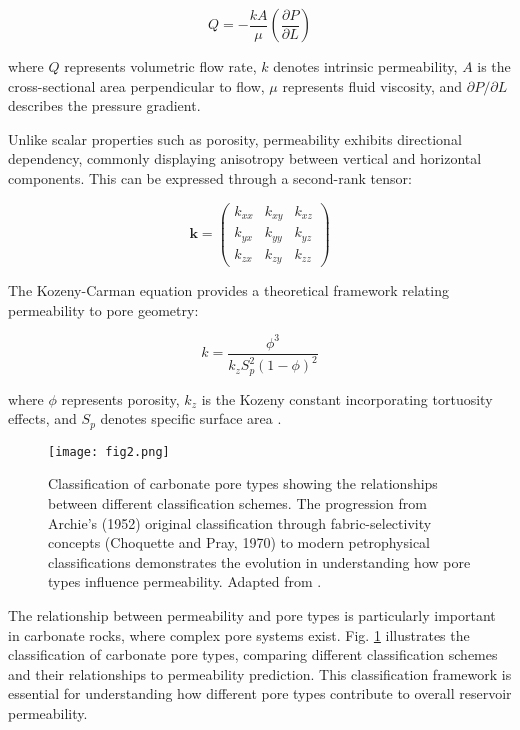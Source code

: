 \documentclass[journal]{IEEEtran}
\begin{document}
\begin{equation}
Q = -\frac{kA}{\mu} \left(\frac{\partial P}{\partial L}\right)
\end{equation}

\noindent where $Q$ represents volumetric flow rate, $k$ denotes intrinsic permeability, $A$ is the cross-sectional area perpendicular to flow, $\mu$ represents fluid viscosity, and $\partial P/\partial L$ describes the pressure gradient.

Unlike scalar properties such as porosity, permeability exhibits directional dependency, commonly displaying anisotropy between vertical and horizontal components. This can be expressed through a second-rank tensor:

\begin{equation}
\mathbf{k} = \begin{pmatrix}
k_{xx} & k_{xy} & k_{xz} \\
k_{yx} & k_{yy} & k_{yz} \\
k_{zx} & k_{zy} & k_{zz}
\end{pmatrix}
\end{equation}

The Kozeny-Carman equation provides a theoretical framework relating permeability to pore geometry:

\begin{equation}
k = \frac{\phi^3}{k_z S_p^2(1-\phi)^2}
\end{equation}

\noindent where $\phi$ represents porosity, $k_z$ is the Kozeny constant incorporating tortuosity effects, and $S_p$ denotes specific surface area \parencite{carman_fluid_1997}.

\begin{figure}[t]
    \centering
    \texttt{[image: fig2.png]}
    \caption{Classification of carbonate pore types showing the relationships between different classification schemes. The progression from Archie's (1952) original classification through fabric-selectivity concepts (Choquette and Pray, 1970) to modern petrophysical classifications demonstrates the evolution in understanding how pore types influence permeability. Adapted from \textcite{f_jerry_lucia_2_rock-fabricpetrophysical_1995}.}
    \label{fig:pore_classification}
\end{figure}

The relationship between permeability and pore types is particularly important in carbonate rocks, where complex pore systems exist. Fig. \ref{fig:pore_classification} illustrates the classification of carbonate pore types, comparing different classification schemes and their relationships to permeability prediction. This classification framework is essential for understanding how different pore types contribute to overall reservoir permeability.
\end{document}
